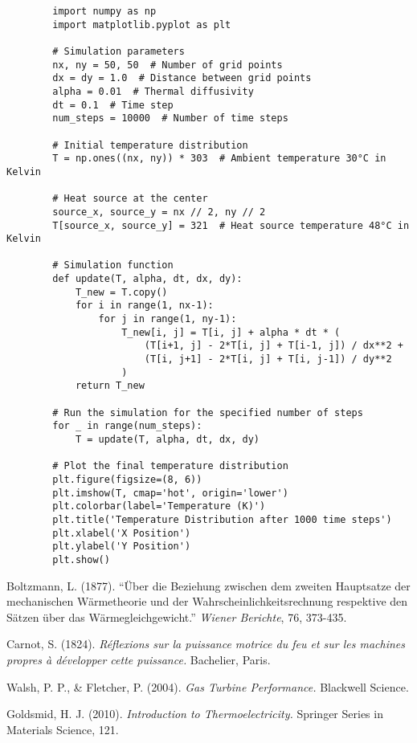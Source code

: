 \documentclass[dvipsnames, svgnames,a4paper,11pt]{article}
\begin{document}
    \begin{lstlisting}
        import numpy as np
        import matplotlib.pyplot as plt
        
        # Simulation parameters
        nx, ny = 50, 50  # Number of grid points
        dx = dy = 1.0  # Distance between grid points
        alpha = 0.01  # Thermal diffusivity
        dt = 0.1  # Time step
        num_steps = 10000  # Number of time steps
        
        # Initial temperature distribution
        T = np.ones((nx, ny)) * 303  # Ambient temperature 30°C in Kelvin
        
        # Heat source at the center
        source_x, source_y = nx // 2, ny // 2
        T[source_x, source_y] = 321  # Heat source temperature 48°C in Kelvin
        
        # Simulation function
        def update(T, alpha, dt, dx, dy):
            T_new = T.copy()
            for i in range(1, nx-1):
                for j in range(1, ny-1):
                    T_new[i, j] = T[i, j] + alpha * dt * (
                        (T[i+1, j] - 2*T[i, j] + T[i-1, j]) / dx**2 +
                        (T[i, j+1] - 2*T[i, j] + T[i, j-1]) / dy**2
                    )
            return T_new
        
        # Run the simulation for the specified number of steps
        for _ in range(num_steps):
            T = update(T, alpha, dt, dx, dy)
        
        # Plot the final temperature distribution
        plt.figure(figsize=(8, 6))
        plt.imshow(T, cmap='hot', origin='lower')
        plt.colorbar(label='Temperature (K)')
        plt.title('Temperature Distribution after 1000 time steps')
        plt.xlabel('X Position')
        plt.ylabel('Y Position')
        plt.show()
    \end{lstlisting}

    \begin{thebibliography}{99}

        Boltzmann, L. (1877). ``Über die Beziehung zwischen dem zweiten Hauptsatze der mechanischen Wärmetheorie und der Wahrscheinlichkeitsrechnung respektive den Sätzen über das Wärmegleichgewicht.'' \emph{Wiener Berichte}, 76, 373-435.
        
        Carnot, S. (1824). \emph{Réflexions sur la puissance motrice du feu et sur les machines propres à développer cette puissance.} Bachelier, Paris.
        
        Walsh, P. P., \& Fletcher, P. (2004). \emph{Gas Turbine Performance.} Blackwell Science.
        
        Goldsmid, H. J. (2010). \emph{Introduction to Thermoelectricity.} Springer Series in Materials Science, 121.
        
    \end{thebibliography}
\end{document}
